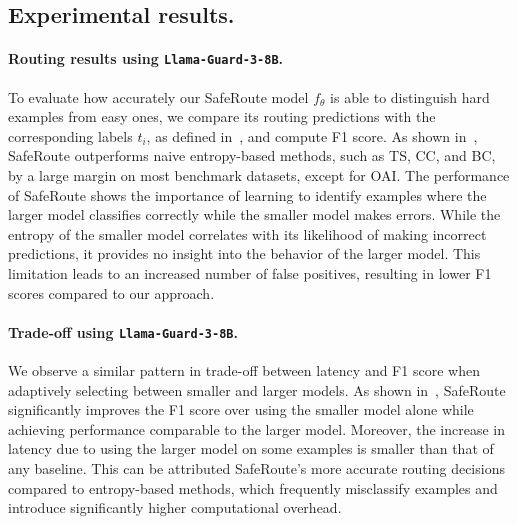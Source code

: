 



\subsection{Experimental results.}

\paragraph{Routing results using \texttt{Llama-Guard-3-8B}.} To evaluate how accurately our SafeRoute model $f_\theta$ is able to distinguish hard examples from easy ones, we compare its routing predictions with the corresponding labels $t_i$, as defined in~, and compute F1 score. As shown in~, SafeRoute outperforms naive entropy-based methods, such as TS, CC, and BC, by a large margin on most benchmark datasets, except for OAI. The performance of SafeRoute shows the importance of learning to identify examples where the larger model classifies correctly while the smaller model makes errors. While the entropy of the smaller model correlates with its likelihood of making incorrect predictions, it provides no insight into the behavior of the larger model. This limitation leads to an increased number of false positives, resulting in lower F1 scores compared to our approach. 


% 



\paragraph{Trade-off using \texttt{Llama-Guard-3-8B}.}
We observe a similar pattern in trade-off between latency and F1 score when adaptively selecting between smaller and larger models. As shown in~, SafeRoute significantly improves the F1 score over using the smaller model alone while achieving performance comparable to the larger model. Moreover, the increase in latency due to using the larger model on some examples is smaller than that of any baseline. 
This can be attributed SafeRoute's more accurate routing decisions compared to entropy-based methods, which frequently misclassify examples and introduce significantly higher computational overhead. 

